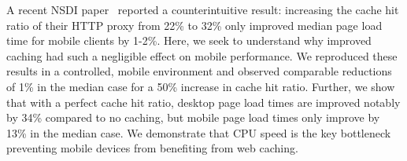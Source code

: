 A recent NSDI paper~\cite{flywheel} reported a counterintuitive result:
increasing the cache hit ratio of their HTTP proxy from 22\% to 32\% only improved median page load time for mobile clients by 1-2\%.
Here, we seek to understand why improved caching had such a negligible effect on mobile performance. 
We reproduced these results in a controlled, mobile environment and observed comparable reductions of 1\% in the median case for a 50\% increase in cache hit ratio.
Further, we show that with a perfect cache hit ratio, desktop page load times are improved notably by 34\% compared to no caching, but mobile page load times only improve by 13\% in the median case.
We demonstrate that CPU speed is the key bottleneck preventing mobile devices from benefiting from web caching.


